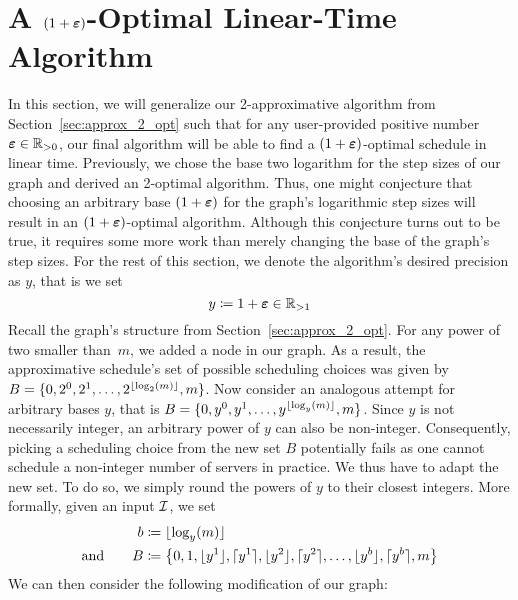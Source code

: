 \section{A $(1+\boldsymbol\varepsilon)$-Optimal Linear-Time Algorithm}
In this section, we will generalize our 2-approximative algorithm from Section~\ref{sec:approx_2_opt} such that for any user-provided positive number $\boldsymbol\varepsilon\in\mathbb{R}_{>0}$, our final algorithm will be able to find a $(1+\boldsymbol\varepsilon)$-optimal schedule in linear time. Previously, we chose the base two logarithm for the step sizes of our graph and derived an 2-optimal algorithm. Thus, one might conjecture that choosing an arbitrary base $(1+\boldsymbol\varepsilon)$ for the graph's logarithmic step sizes will result in an $(1+\boldsymbol\varepsilon)$-optimal algorithm. Although this conjecture turns out to be true, it requires some more work than merely changing the base of the graph's step sizes. For the rest of this section, we denote the algorithm's desired precision as $y$, that is we set
\begin{equation*}
	y\coloneqq 1+\boldsymbol\varepsilon\in\mathbb{R}_{>1}
\end{equation*}
Recall the graph's structure from Section~\ref{sec:approx_2_opt}. For any power of two smaller than~$m$, we added a node in our graph. As a result, the approximative schedule's set of possible scheduling choices was given by $B=\{0,2^0,2^1,\dotsc,2^{\lfloor\log_2(m)\rfloor},m\}$. Now consider an analogous attempt for arbitrary bases $y$, that is $B=\{0,y^0,y^1,\dotsc,y^{\lfloor\log_y(m)\rfloor},m\}$. Since $y$ is not necessarily integer, an arbitrary power of $y$ can also be non-integer. Consequently, picking a scheduling choice from the new set $B$ potentially fails as one cannot schedule a non-integer number of servers in practice. We thus have to adapt the new set. To do so, we simply round the powers of $y$ to their closest integers. More formally, given an input $\mathcal{I}$, we set
\begin{align*}
	b&\coloneqq\lfloor\log_y(m)\rfloor\\
	\text{and}\qquad B&\coloneqq\left\{0,1,\lfloor y^1\rfloor,\lceil y^1\rceil,\lfloor y^2\rfloor,\lceil y^2\rceil,\dotsc,\lfloor y^b\rfloor,\lceil y^b\rceil,m\right\}
\end{align*}
We can then consider the following modification of our graph:
